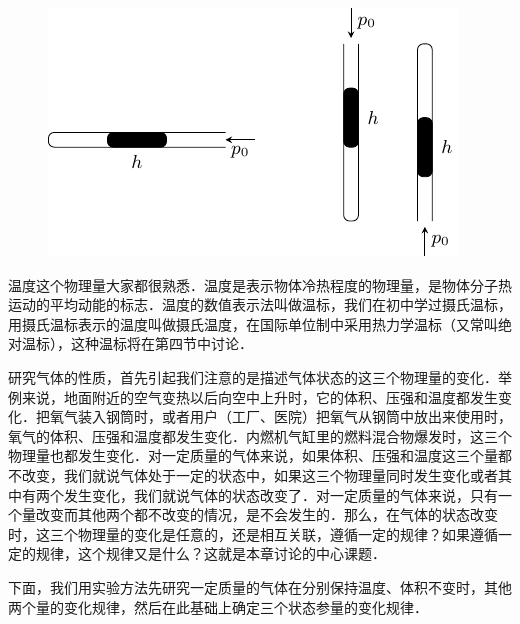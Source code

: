 \begin{figure}[htbp]
    \centering
    \includegraphics{fig/B/3-2.pdf}
    \caption{}\label{fig_B_3-2}
\end{figure}

温度这个物理量大家都很熟悉．温度是表示物体冷热程度的物理量，是物体分子热运动的平均动能的标志．温度的数值表示法叫做温标，我们在初中学过摄氏温标，用摄氏温标表示的温度叫做摄氏温度，在国际单位制中采用热力学温标（又常叫绝对温标），这种温标将在第四节中讨论．

研究气体的性质，首先引起我们注意的是描述气体状态的这三个物理量的变化．举例来说，地面附近的空气变热以后向空中上升时，它的体积、压强和温度都发生变化．把氧气装入钢筒时，或者用户（工厂、医院）把氧气从钢筒中放出来使用时，氧气的体积、压强和温度都发生变化．内燃机气缸里的燃料混合物爆发时，这三个物理量也都发生变化．对一定质量的气体来说，如果体积、压强和温度这三个量都不改变，我们就说气体处于一定的状态中，如果这三个物理量同时发生变化或者其中有两个发生变化，我们就说气体的状态改变了．对一定质量的气体来说，只有一个量改变而其他两个都不改变的情况，是不会发生的．那么，在气体的状态改变时，这三个物理量的变化是任意的，还是相互关联，遵循一定的规律？如果遵循一定的规律，这个规律又是什么？这就是本章讨论的中心课题．

下面，我们用实验方法先研究一定质量的气体在分别保持温度、体积不变时，其他两个量的变化规律，然后在此基础上确定三个状态参量的变化规律．


